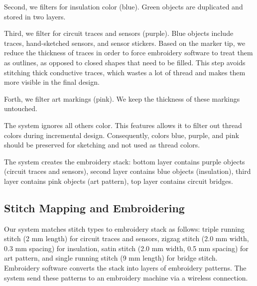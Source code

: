 Second, we filters for insulation color (blue). Green objects are duplicated and stored in two layers.

Third, we filter for circuit traces and sensors (purple). Blue objects include traces, hand-sketched sensors, and sensor stickers. Based on the marker tip, we reduce the thickness of traces in order to force embroidery software to treat them as outlines, as opposed to closed shapes that need to be filled. This step avoids stitching thick conductive traces, which wastes a lot of thread and makes them more visible in the final design.

Forth, we filter art markings (pink). We keep the thickness of these markings untouched.

The system ignores all others color. This features allows it to filter out thread colors during incremental design. Consequently, colors blue, purple, and pink should be preserved for sketching and not used as thread colors. 

The system creates the embroidery stack: bottom layer contains purple objects (circuit traces and sensors), second layer contains blue objects (insulation), third layer contains pink objects (art pattern), top layer contains circuit bridges.

\subsection{Stitch Mapping and Embroidering}
Our system matches stitch types to embroidery stack as follows: triple running stitch (2 mm length) for circuit traces and sensors, zigzag stitch (2.0 mm width, 0.3 mm spacing) for insulation, satin stitch (2.0 mm width, 0.5 mm spacing) for art pattern, and single running stitch (9 mm length) for bridge stitch. Embroidery software converts the stack into layers of embroidery patterns. The system send these patterns to an embroidery machine via a wireless connection. 





